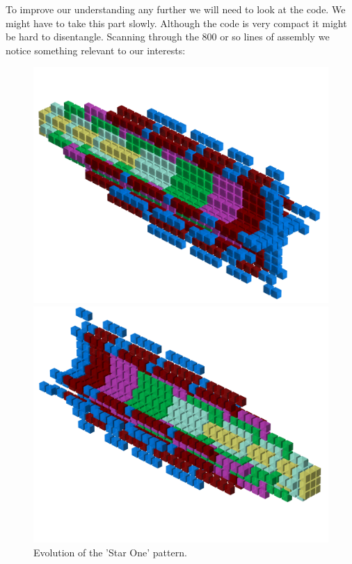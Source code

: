 To improve our understanding any further we will need to look at the code. We might have to take this part slowly.
Although the code is very compact it might be hard to disentangle. Scanning through the 800 or so lines of assembly
we notice something relevant to our interests:

\clearpage
\begin{figure}[H]
    \centering
    \begin{adjustbox}{width=12cm,center}
      \includegraphics[width=12cm]{src/patterns/pattern0-45.png}%
    \end{adjustbox}
    \begin{adjustbox}{width=12cm,margin=0cm -2cm}
      \includegraphics[width=12cm]{src/patterns/pattern0-225.png}%
    \end{adjustbox}
\caption{Evolution of the 'Star One' pattern.}
\end{figure}

